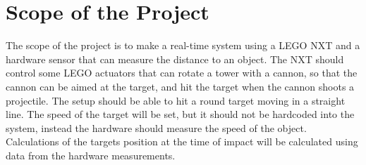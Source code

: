 \section{Scope of the Project}
The scope of the project is to make a real-time system using a LEGO NXT and a hardware sensor that can measure the distance to an object. The NXT should control some LEGO actuators that can rotate a tower with a cannon, so that the cannon can be aimed at the target, and hit the target when the cannon shoots a projectile. The setup should be able to hit a round target moving in a straight line. The speed of the target will be set, but it should not be hardcoded into the system, instead the hardware should measure the speed of the object. Calculations of the targets position at the time of impact will be calculated using data from the hardware measurements.